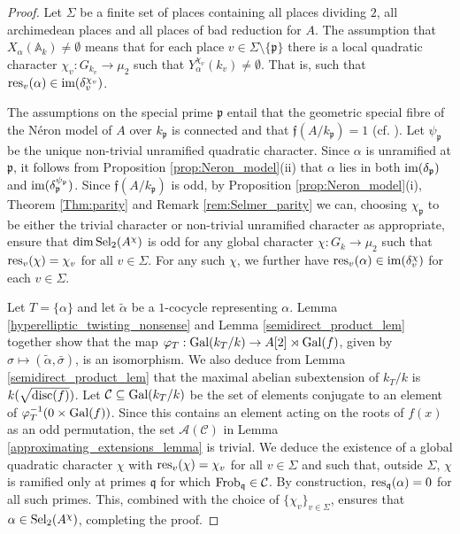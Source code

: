 \documentclass[10pt]{amsart}
\numberwithin{equation}{section}
\theoremstyle{remark}
\theoremstyle{definition}
\theoremstyle{definition}
\theoremstyle{definition}
\theoremstyle{definition}
\theoremstyle{definition}
\theoremstyle{definition}
\theoremstyle{definition}
\theoremstyle{definition}
\begin{document}
 \begin{proof}
Let $\Sigma$ be a finite set of places containing all places dividing $2$, all archimedean places and all places of bad reduction for $A$.  The assumption that $X_\alpha(\mathbb{A}_k)\neq \emptyset$ means that for each place $v\in \Sigma\setminus \{\mathfrak{p}\}$ there is a local quadratic character $\chi_v:G_{k_v}\to \mu_2$ such that $Y_\alpha^{\chi_v}(k_v)\neq \emptyset$. That is, such that $\textup{res}_v(\alpha)\in \textup{im}(\delta_v^{\chi_v})$. 

The assumptions on the special prime $\mathfrak{p}$ entail that the  geometric   special fibre of the N\'{e}ron model of $A$ over $k_\mathfrak{p}$ is connected and that $\mathfrak{f}(A/k_\mathfrak{p})=1$ (cf. \cite[Proof of Corollary 2.4]{HS16}). Let $\psi_\mathfrak{p}$ be the unique non-trivial unramified quadratic character. Since $\alpha$ is unramified at $\mathfrak{p}$, it follows from Proposition \ref{prop:Neron_model}(ii) that $\alpha$ lies in both $\textup{im}(\delta_\mathfrak{p})$ and $\textup{im}(\delta_\mathfrak{p}^{\psi_{\mathfrak{p}}})$. Since $\mathfrak{f}(A/k_\mathfrak{p})$ is odd, by Proposition \ref{prop:Neron_model}(i), Theorem \ref{Thm:parity} and Remark \ref{rem:Selmer_parity} we can,  choosing $\chi_{\mathfrak{p}}$ to be either the trivial character or non-trivial unramified character as appropriate,  ensure that $\dim \textup{Sel}_2(A^\chi)$ is odd for any global character $\chi:G_k\to \mu_2$ such that $\textup{res}_v(\chi)=\chi_v$ for all $v\in \Sigma$. For any such $\chi$, we further have $\textup{res}_{v}(\alpha)\in \textup{im}(\delta_v^{\chi})$ for each $v\in \Sigma$.

Let $T=\{\alpha\}$ and let $\widetilde{\alpha}$ be a $1$-cocycle representing $\alpha$. Lemma \ref{hyperelliptic_twisting_nonsense} and Lemma \ref{semidirect_product_lem} together show that the map $\varphi_T:\textup{Gal}(k_T/k)\to A[2]\rtimes \textup{Gal}(f)$, given by $\sigma \mapsto (\widetilde{\alpha},\bar{\sigma})$, is an isomorphism. We also deduce from Lemma \ref{semidirect_product_lem} that the maximal abelian subextension of $k_T/k$ is $k(\sqrt{\textup{disc}(f)})$. Let $\mathcal{C}\subseteq \textup{Gal}(k_T/k)$ be the set of elements conjugate to an element of $\varphi_T^{-1}(0\times \textup{Gal}(f))$. Since this contains an element acting on the roots of $f(x)$ as an odd permutation, the set $\mathcal{A}(\mathcal{C})$ in Lemma \ref{approximating_extensions_lemma} is trivial. We deduce the existence of a global quadratic character $\chi$ with $\textup{res}_v(\chi)=\chi_v$ for all $v\in \Sigma$ and such that, outside $\Sigma$, $\chi$ is ramified only at primes $\mathfrak{q}$ for which $\textup{Frob}_{\mathfrak{q}}\in \mathcal{C}$. By construction, $\textup{res}_{\mathfrak{q}}(\alpha)=0$ for all such primes. This, combined with the choice of $\{\chi_v\}_{v\in \Sigma}$, ensures that $\alpha\in \textup{Sel}_2(A^\chi)$, completing the proof.
 \end{proof}
 
\end{document}
